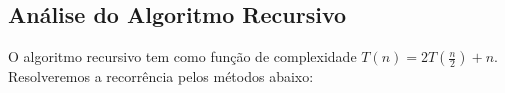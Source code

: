 \subsection{Análise do Algoritmo Recursivo}
O algoritmo recursivo tem como função de complexidade $T(n) = 2T(\frac{n}{2}) + n$. Resolveremos a recorrência pelos métodos abaixo:



